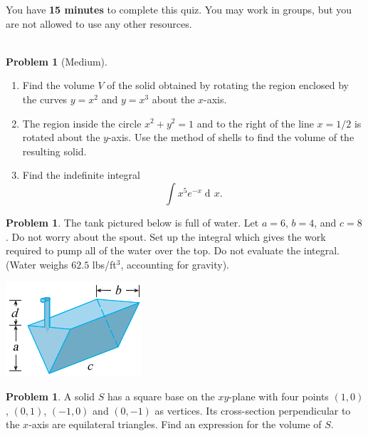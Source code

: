 \documentclass[12pt]{article}
\theoremstyle{plain}
\theoremstyle{definition}
\newtheorem{problem}[exercise]{Problem}
\theoremstyle{remark}
\DeclareMathOperator{\diff}{d\!}
\begin{document}
\author{TA: \href{mailto:\authoremail}{\documentauthor}}
\title{\documenttitle}
\date{\today}
\maketitle

You have \textbf{15 minutes} to complete this quiz. You may work in groups,
but you are not allowed to use any other resources.
\\\\
\begin{problem}[Medium]
\begin{enumerate}[label=(\alph*)]
\item Find the volume $V$ of the solid obtained by rotating the region
  enclosed by the curves $y=x^2$ and $y=x^3$ about the $x$-axis.
\item The region inside the circle $x^2+y^2=1$ and to the right of the line
  $x=1/2$ is rotated about the $y$-axis. Use the method of shells to find
  the volume of the resulting solid.
\item Find the indefinite integral
\[
\int x^5e^{-x}\diff x.
\]
\end{enumerate}
\end{problem}
\begin{problem}
  The tank pictured below is full of water. Let $a=6$, $b=4$, and $c=8$. Do
  not worry about the spout. Set up the integral which gives the work
  required to pump all of the water over the top. Do not evaluate the
  integral. (Water weighs $62.5$ lbs/ft$^3$, accounting for gravity).
\begin{center}
\includegraphics[scale=0.5]{../figures/hw-7-fig-2}
\end{center}
\end{problem}
\begin{problem}
A solid $S$ has a square base on the $xy$-plane with four points $(1,0)$,
$(0,1)$, $(-1,0)$ and $(0,-1)$ as vertices. Its cross-section perpendicular
to the $x$-axis are equilateral triangles. Find an expression for the
volume of $S$.
\end{problem}
\newpage
\end{document}

